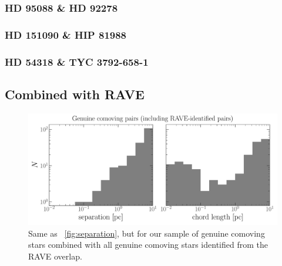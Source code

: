 \documentclass[modern, letterpaper]{aastex61}
\newcommand{\tgas}{\acronym{TGAS}}
\begin{document}
\subsubsection{HD 95088 \& HD 92278}



\subsubsection{HD 151090 \& HIP 81988}



\subsubsection{HD 54318 \& TYC 3792-658-1}



\subsection{Combined with RAVE}\label{sec:rave}

\begin{figure}[htbp]
  \begin{center}
    \includegraphics[width=\linewidth]{separation-hist-rave.pdf}
  \end{center}
  \caption{%
    Same as \figurename~\ref{fig:separation}, but for our sample of genuine
    comoving stars combined with all genuine comoving stars identified from the
    RAVE overlap.
    \label{fig:separation-RAVE}}
\end{figure}

\end{document}
